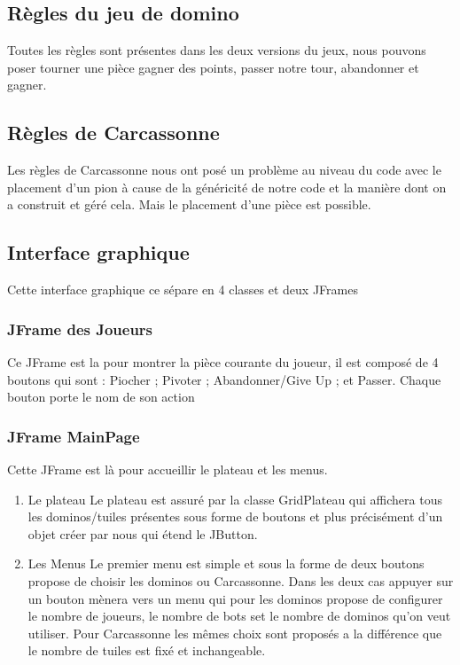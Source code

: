 \documentclass[11pt]{article}
\begin{document}
\subsection{Règles du jeu de domino}
\label{sec:org2c6f352}
Toutes les règles sont présentes dans les deux versions du jeux, nous pouvons poser tourner une pièce gagner des points, passer notre tour, abandonner et gagner.
\subsection{Règles de Carcassonne}
\label{sec:orgc73cb78}
Les règles de Carcassonne nous ont posé un problème au niveau du code avec le placement d'un pion à cause de la généricité de notre code et la manière dont on a construit et géré cela. Mais le placement d'une pièce est possible.
\subsection{Interface graphique}
\label{sec:orgd2768ac}
Cette interface graphique ce sépare en 4 classes et deux JFrames
\subsubsection{JFrame des Joueurs}
\label{sec:org2acc656}
Ce JFrame est la pour montrer la pièce courante du joueur, il est composé de 4 boutons qui sont : Piocher ; Pivoter ; Abandonner/Give Up ; et Passer. Chaque bouton porte le nom de son action 
\subsubsection{JFrame MainPage}
\label{sec:org6c53f87}
Cette JFrame est là pour accueillir le plateau et les menus.
\begin{enumerate}
\item Le plateau
\label{sec:org9a81476}
Le plateau est assuré par la classe GridPlateau qui affichera tous les dominos/tuiles présentes sous forme de boutons et plus précisément d'un objet créer par nous qui étend le JButton. 
\item Les Menus
\label{sec:org8297c7f}
Le premier menu est simple et sous la forme de deux boutons propose de choisir les dominos ou Carcassonne. Dans les deux cas appuyer sur un bouton mènera vers un menu qui pour les dominos propose de configurer le nombre de joueurs, le nombre de bots set le nombre de dominos qu'on veut utiliser. Pour Carcassonne les mêmes choix sont proposés a la différence que le nombre de tuiles est fixé et inchangeable.
\end{enumerate}
\end{document}
